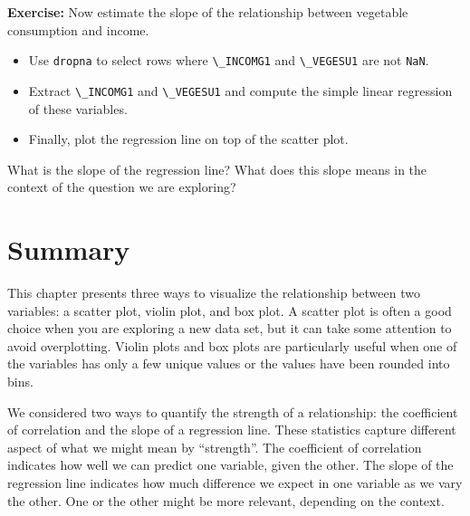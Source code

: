 \textbf{Exercise:} Now estimate the slope of the relationship between
vegetable consumption and income.

\begin{itemize}
\item
  Use \passthrough{\lstinline!dropna!} to select rows where
  \passthrough{\lstinline!\_INCOMG1!} and
  \passthrough{\lstinline!\_VEGESU1!} are not
  \passthrough{\lstinline!NaN!}.
\item
  Extract \passthrough{\lstinline!\_INCOMG1!} and
  \passthrough{\lstinline!\_VEGESU1!} and compute the simple linear
  regression of these variables.
\item
  Finally, plot the regression line on top of the scatter plot.
\end{itemize}

What is the slope of the regression line? What does this slope means in
the context of the question we are exploring?

\pagebreak

\section{Summary}\label{summary}

This chapter presents three ways to visualize the relationship between
two variables: a scatter plot, violin plot, and box plot. A scatter plot
is often a good choice when you are exploring a new data set, but it can
take some attention to avoid overplotting. Violin plots and box plots
are particularly useful when one of the variables has only a few unique
values or the values have been rounded into bins.

We considered two ways to quantify the strength of a relationship: the
coefficient of correlation and the slope of a regression line. These
statistics capture different aspect of what we might mean by
``strength''. The coefficient of correlation indicates how well we can
predict one variable, given the other. The slope of the regression line
indicates how much difference we expect in one variable as we vary the
other. One or the other might be more relevant, depending on the
context.
